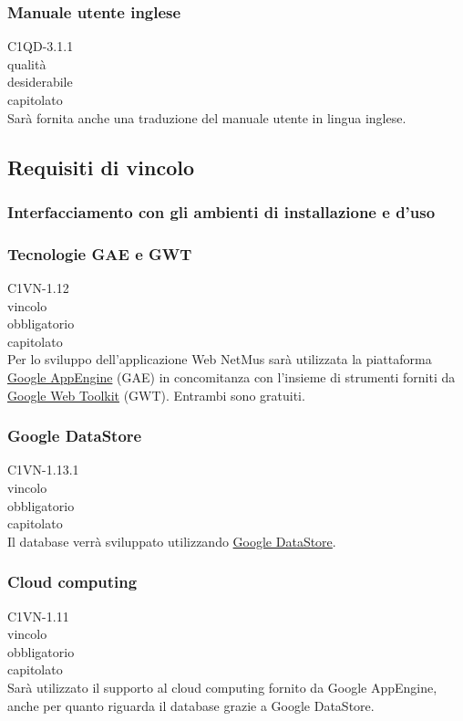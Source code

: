 \subsubsection*{Manuale utente inglese}
 C1QD-3.1.1 \\
 qualit\`a \\
 desiderabile \\
 capitolato \\
Sar\`a fornita anche una traduzione del manuale utente in lingua inglese.


\subsection{Requisiti di vincolo}

\subsubsection{Interfacciamento con gli ambienti di installazione e d'uso }

\subsubsection*{Tecnologie GAE e GWT}
 C1VN-1.12 \\
 vincolo \\
 obbligatorio \\
 capitolato \\
Per lo sviluppo dell'applicazione Web NetMus sar\`a utilizzata la piattaforma
\underline{Google AppEngine} (GAE) in concomitanza con l'insieme di strumenti
forniti da \underline{Google Web Toolkit} (GWT). Entrambi sono gratuiti.

\subsubsection*{Google DataStore}
 C1VN-1.13.1 \\
 vincolo \\
 obbligatorio \\
 capitolato \\
Il database verr\`a sviluppato utilizzando \underline{Google DataStore}.

\subsubsection*{Cloud computing}
 C1VN-1.11 \\
 vincolo \\
 obbligatorio \\
 capitolato \\
Sar\`a utilizzato il supporto al cloud computing fornito da Google AppEngine,
anche per quanto riguarda il database grazie a Google DataStore.


